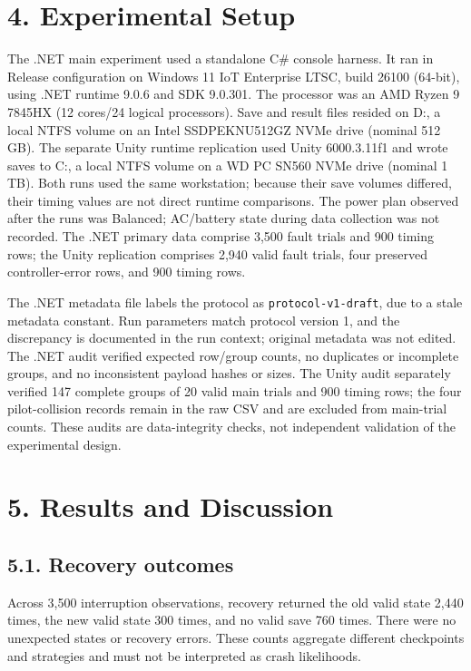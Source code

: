 \documentclass{jepcs}
\begin{document}
\section{4. Experimental Setup}
The .NET main experiment used a standalone C\# console harness. It ran in Release configuration on Windows 11 IoT Enterprise LTSC, build 26100 (64-bit), using .NET runtime 9.0.6 and SDK 9.0.301. The processor was an AMD Ryzen 9 7845HX (12 cores/24 logical processors). Save and result files resided on D:, a local NTFS volume on an Intel SSDPEKNU512GZ NVMe drive (nominal 512 GB). The separate Unity runtime replication used Unity 6000.3.11f1 and wrote saves to C:, a local NTFS volume on a WD PC SN560 NVMe drive (nominal 1 TB). Both runs used the same workstation; because their save volumes differed, their timing values are not direct runtime comparisons. The power plan observed after the runs was Balanced; AC/battery state during data collection was not recorded. The .NET primary data comprise 3,500 fault trials and 900 timing rows; the Unity replication comprises 2,940 valid fault trials, four preserved controller-error rows, and 900 timing rows.

The .NET metadata file labels the protocol as \texttt{protocol-v1-draft}, due to a stale metadata constant. Run parameters match protocol version 1, and the discrepancy is documented in the run context; original metadata was not edited. The .NET audit verified expected row/group counts, no duplicates or incomplete groups, and no inconsistent payload hashes or sizes. The Unity audit separately verified 147 complete groups of 20 valid main trials and 900 timing rows; the four pilot-collision records remain in the raw CSV and are excluded from main-trial counts. These audits are data-integrity checks, not independent validation of the experimental design.

\section{5. Results and Discussion}
\subsection{5.1. Recovery outcomes}
Across 3,500 interruption observations, recovery returned the old valid state 2,440 times, the new valid state 300 times, and no valid save 760 times. There were no unexpected states or recovery errors. These counts aggregate different checkpoints and strategies and must not be interpreted as crash likelihoods.
\end{document}
